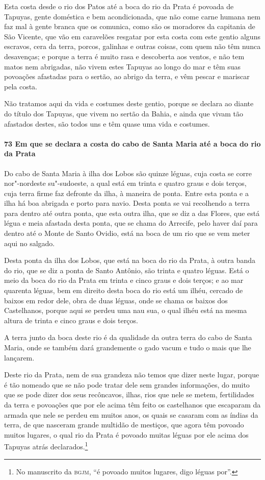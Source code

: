 \begin{linenumbers}
Esta costa desde o rio dos Patos até a boca do rio da Prata é povoada de Tapuyas, gente
doméstica e bem acondicionada, que não come carne humana nem faz mal à gente branca que os
comunica, como são os moradores da capitania de São Vicente, que vão em caravelões
resgatar por esta costa com este gentio alguns escravos, cera da terra, porcos, galinhas e
outras coisas, com quem não têm nunca desavenças; e porque a terra é muito rasa e
descoberta aos ventos, e não tem matos nem abrigadas, não vivem estes Tapuyas ao longo do
mar e têm suas povoações afastadas para o sertão, ao abrigo da terra, e vêm pescar e
mariscar pela costa.

Não tratamos aqui da vida e costumes deste gentio, porque se declara ao diante do título
dos Tapuyas, que vivem no sertão da Bahia, e ainda que vivam tão afastados destes, são
todos uns e têm quase uma vida e costumes.

\paragraph{73 Em que se declara a costa do cabo de Santa Maria até a boca do rio da Prata} \quad
Do cabo de Santa Maria à ilha dos Lobos são quinze léguas, cuja costa se corre
nor"-nordeste su"-sudoeste, a qual está em trinta e quatro graus e dois terços, cuja terra
firme faz defronte da ilha, à maneira de ponta. Entre esta ponta e a ilha há boa abrigada
e porto para navio. Desta ponta se vai recolhendo a terra para dentro até outra ponta, que
esta outra ilha, que se diz a das Flores, que está légua e meia afastada desta ponta, que
se chama do Arrecife, pelo haver daí para dentro até o Monte de Santo Ovidio, está na boca
de um rio que se vem meter aqui no salgado.

Desta ponta da ilha dos Lobos, que está na boca do rio da Prata, à outra banda do rio, que
se diz a ponta de Santo Antônio, são trinta e quatro léguas. Está o meio da boca do rio da
Prata em trinta e cinco graus e dois terços; e ao mar quarenta léguas, bem em direito
desta boca do rio está um ilhéu, cercado de baixos em redor dele, obra de duas léguas,
onde se chama os baixos dos Castelhanos, porque aqui se perdeu uma nau sua, o qual ilhéu
está na mesma altura de trinta e cinco graus e dois terços.

A terra junto da boca deste rio é da qualidade da outra terra do cabo de Santa Maria, onde
se também dará grandemente o gado vacum e tudo o mais que lhe lançarem.

Deste rio da Prata, nem de sua grandeza não temos que dizer neste lugar, porque é tão
nomeado que se não pode tratar dele sem grandes informações, do muito que se pode dizer
dos seus recôncavos, ilhas, rios que nele se metem, fertilidades da terra e povoações que
por ele acima têm feito os castelhanos que escaparam da armada que nele se perdeu em
muitos anos, os quais se casaram com as índias da terra, de que nasceram grande multidão
de mestiços, que agora têm povoado muitos lugares, o qual rio da Prata é povoado muitas
léguas por ele acima dos Tapuyas atrás declarados.\footnote{ No manuscrito da
\textsc{bgjm}, ``é povoado muitos lugares, digo léguas por''.}


\end{linenumbers}
